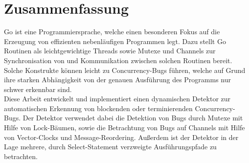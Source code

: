 \chapter*{Zusammenfassung}
Go ist eine Programmiersprache, welche einen besonderen Fokus auf 
die Erzeugung von effizienten nebenläufigen Programmen legt. Dazu 
stellt Go Routinen als leichtgewichtige Threads sowie 
Mutexe und Channels zur Synchronisation von und Kommunikation zwischen 
solchen Routinen bereit. Solche Konstrukte können leicht zu 
Concurrency-Bugs führen, welche auf Grund ihre starken Abhängigkeit von der 
genauen Ausführung des Programms nur schwer erkennbar sind.\\
Diese Arbeit entwickelt und implementiert einen dynamischen Detektor zur automatischen
Erkennung von blockenden oder terminierenden Concurrency-Bugs. 
Der Detektor verwendet dabei die Detektion 
von Bugs durch Mutexe mit Hilfe von Lock-Bäumen, sowie die Betrachtung von 
Bugs auf Channels mit Hilfe von 
Vector-Clocks und Message-Reordering. Außerdem ist der Detektor in der 
Lage mehrere, durch Select-Statement verzweigte Ausführungspfade zu betrachten.